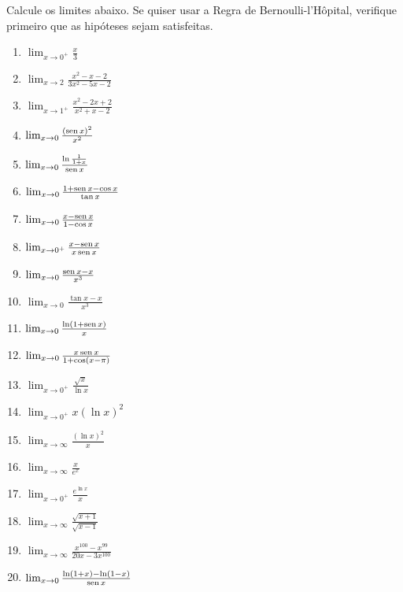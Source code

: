 \begin{exo}\label{Exo:BHbasic}
Calcule os limites abaixo. Se quiser usar a Regra de Bernoulli-l'Hôpital,
verifique primeiro que as hipóteses sejam satisfeitas.
\begin{multicols}{3}
\begin{enumerate}
\item\label{itexBH1} $\lim_{x\to 0^+}\frac{x}{3}$
\item\label{itexBH2} $\lim_{x\to 2}\frac{x^2-x-2}{3x^2-5x-2}$
\item\label{itexBH2b} $\lim_{x\to 1^+}\frac{x^2-2x+2}{x^2+x-2}$
\item\label{itexBH3} $\lim_{x\to 0}\frac{(\operatorname{sen} x)^2}{x^2}$
\item\label{itexBH4} $\lim_{x\to 0}\frac{\ln\frac{1}{1+x}}{\operatorname{sen} x}$
\item\label{itexBH14} $\lim_{x\to 0}\frac{1+\operatorname{sen} x-\cos x}{\tan x}$ %
\item\label{itexBH7} $\lim_{x\to 0}\frac{x-\operatorname{sen} x}{1-\cos x}$
\item\label{itexBH5} $\lim_{x\to 0^+}\frac{x-\operatorname{sen} x}{x\operatorname{sen} x}$
\item\label{itexBH10} $\lim_{x\to 0}\frac{\operatorname{sen} x-x}{x^3}$
\item\label{itexBH9} $\lim_{x\to 0}\frac{\tan x -x}{x^3}$
\item\label{itexBH922} $\lim_{x\to 0}\frac{\ln(1+\operatorname{sen} x)}{x}$
\item\label{itexBH11} $\lim_{x\to 0}\frac{x\operatorname{sen} x}{1+\cos(x-\pi)}$ %
\item\label{itexBH12} $\lim_{x\to 0^+}\frac{\sqrt{x}}{\ln x}$
\item\label{itexBH12aa} $\lim_{x\to 0^+}x(\ln x)^2$
\item\label{itexBH12a} $\lim_{x\to \infty}\frac{(\ln x)^2}{x}$
\item\label{itexBH12ab} $\lim_{x\to \infty}\frac{x}{e^{x}}$
\item\label{itexBH12b} $\lim_{x\to 0^+}\frac{e^{\ln x}}{x}$
\item\label{itexBH12c} $\lim_{x\to \infty}\frac{\sqrt{x+1}}{\sqrt{x-1}}$
\item\label{itexBH12d} $\lim_{x\to
\infty}\frac{x^{100}-x^{99}}{20x-3x^{100}}$
\item\label{itexBH13} $\lim_{x\to 0}\frac{\ln (1+x)-\ln(1-x)}{\operatorname{sen} x}$ %


\end{enumerate}
\end{multicols}
\end{exo}
